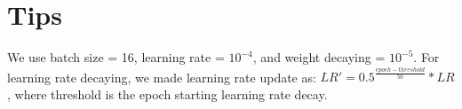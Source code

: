 \documentclass[12pt, a4paper]{article}
\begin{document}
	\section{Tips}
	We use batch size = 16, learning rate = $10^{-4}$, and weight decaying = $10^{-5}$. For learning rate decaying, we made learning rate update as: $LR' = 0.5^{\frac{epoch - threshold}{50}} * LR$, where threshold is the epoch starting learning rate decay.
	
\end{document}
